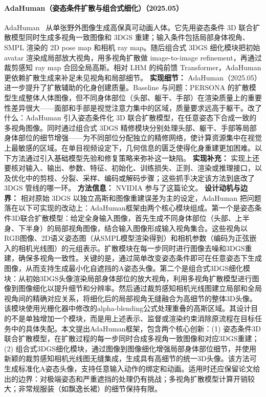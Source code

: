 \paragraph{AdaHuman（姿态条件扩散与组合式细化）（2025.05）}
AdaHuman~\cite{2505_24877} 从单张野外图像生成高保真可动画人体。它先用姿态条件 3D 联合扩散模型同时生成多视角一致图像和 3DGS 重建；输入条件包括局部身体视角、SMPL 渲染的 2D pose map 和相机 ray map。随后组合式 3DGS 细化模块把初始 avatar 渲染成局部放大视角，用多视角扩散做 image-to-image refinement，再通过裁剪感知 ray map 合回全局高斯。相对 LHM 的纯前馈 Transformer，AdaHuman 更依赖扩散生成来补足未见视角和局部细节。
\textbf{实现细节：} AdaHuman（2025.05） 进一步提升了扩散辅助的化身创建质量。Baseline 与问题：PERSONA 的扩散模型生成整体人体图像，但不同身体部位（头部、躯干、手部）在渲染质量上的重要性差异很大——面部和手部是视觉注意力集中的区域，质量要求远高于躯干。改了什么：AdaHuman 引入姿态条件化 3D 联合扩散模型，在任意姿态下合成一致的多视角图像。同时通过组合式 3DGS 精修模块分别处理头部、躯干、手部等局部身体部位的细节增强——为不同部位分配独立的精修网络，使计算资源集中在视觉上最敏感的区域。在单目视频设定下，几何信息的匮乏使得化身重建更加困难。以下方法通过引入基础模型先验和修复策略来弥补这一缺陷。
\textbf{实现补充：} 实现上还要核对输入、输出、参数、特征、初始化、训练损失、正则、渲染或推理接口，以及优化中的剪枝、分裂、采样、编码或解码步骤；这些抓手决定该方法到底改了 3DGS 管线的哪一环。
\textbf{方法信息：} NVIDIA 参与了这篇论文。
\textbf{设计动机与边界：} 相对原始 3DGS 以独立高斯和图像重建误差为主的设定，AdaHuman 把问题落在以下可实现的改动上：AdaHuman框架由两个核心模块组成。第一个是姿态条件3D联合扩散模型：给定全身输入图像，首先生成不同身体部位（头部、上半身、下半身）的局部视角图像，结合输入图像形成输入视角集合。这些视角以RGB图像、2D语义姿态图（从SMPL模型渲染得到）和相机参数（编码为正弦嵌入的相机光线图）的元组表示。扩散模块在每一步同时进行图像去噪和3DGS重建，确保多视角一致性。关键的是，通过简单改变姿态条件即可在任意姿态下生成图像，从而支持生成最小化自遮挡的A姿态头像。第二个是组合式3DGS细化模块：从初始3DGS头像渲染局部身体部位的放大视角，利用多视角扩散模型进行图像到图像细化以提升细节和分辨率。然后通过裁剪感知相机光线图建立局部和全局视角间的精确对应关系，将细化后的局部视角无缝融合为高细节的整体3D头像。该模块使用光栅化器中修改的alpha-blending公式处理重叠的高斯区域。其设计目的不是单独增加一个模块，而是用上述表示、监督或渲染约束消除原流程在目标任务中的具体失配。本文提出AdaHuman框架，包含两个核心创新：(1) 姿态条件3D联合扩散模型，在扩散过程的每一步同时合成多视角一致图像和对应3DGS重建；(2) 组合式3DGS细化模块，通过图像到图像细化增强局部身体部位细节，并使用新颖的裁剪感知相机光线图无缝集成，生成具有高细节的统一3D头像。该方法可生成标准化A姿态头像，支持任意输入动作的绑定和动画。适用时还应保留论文给出的边界：对极端姿态和严重遮挡的处理仍有挑战；多视角扩散模型计算开销较大；非常规服装（如飘逸长裙）的细节保持有限。

